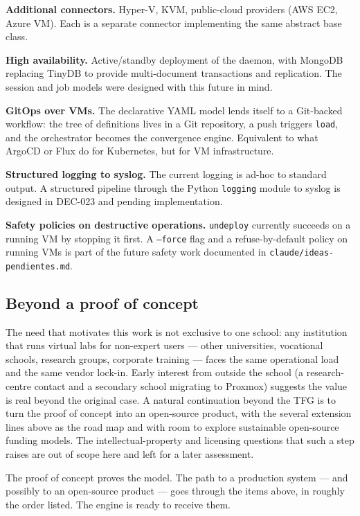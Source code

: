 \textbf{Additional connectors.} Hyper-V, KVM, public-cloud
providers (AWS EC2, Azure VM). Each is a separate connector
implementing the same abstract base class.

\textbf{High availability.} Active/standby deployment of the
daemon, with MongoDB replacing TinyDB to provide multi-document
transactions and replication. The session and job models were
designed with this future in mind.

\textbf{GitOps over VMs.} The declarative YAML model lends itself
to a Git-backed workflow: the tree of definitions lives in a Git
repository, a push triggers \texttt{load}, and the orchestrator
becomes the convergence engine. Equivalent to what ArgoCD or Flux
do for Kubernetes, but for VM infrastructure.

\textbf{Structured logging to syslog.} The current logging is
ad-hoc to standard output. A structured pipeline through the
Python \texttt{logging} module to syslog is designed in DEC-023
and pending implementation.

\textbf{Safety policies on destructive operations.}
\texttt{undeploy} currently succeeds on a running VM by stopping
it first. A \texttt{--force} flag and a refuse-by-default policy
on running VMs is part of the future safety work documented in
\texttt{claude/ideas-pendientes.md}.

\subsection{Beyond a proof of concept}

The need that motivates this work is not exclusive to one school: any
institution that runs virtual labs for non-expert users --- other
universities, vocational schools, research groups, corporate training
--- faces the same operational load and the same vendor lock-in.
Early interest from outside the school (a research-centre contact and
a secondary school migrating to Proxmox) suggests the value is real
beyond the original case. A natural continuation beyond the TFG is to
turn the proof of concept into an open-source product, with the
several extension lines above as the road map and with room to explore
sustainable open-source funding models. The intellectual-property and
licensing questions that such a step raises are out of scope here and
left for a later assessment.


The proof of concept proves the model. The path to a production
system --- and possibly to an open-source product --- goes through the
items above, in roughly the order listed. The engine is ready to
receive them.
